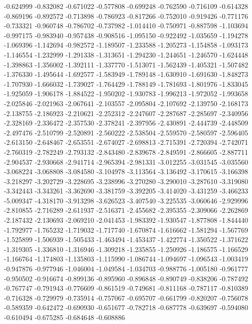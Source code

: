 -0.624999
-0.832082
-0.671022
-0.577808
-0.699248
-0.762590
-0.716109
-0.614328
-0.869196
-0.892572
-0.713898
-0.786923
-0.817266
-0.752010
-0.919426
-0.771176
-0.733321
-0.960748
-0.786702
-0.737982
-1.014410
-0.750971
-0.887598
-1.103694
-0.997175
-0.983940
-0.957438
-0.908516
-1.095150
-0.922492
-1.035659
-1.194278
-1.069396
-1.142694
-0.982572
-1.189507
-1.233588
-1.205273
-1.154858
-1.093173
-1.146554
-1.232999
-1.291338
-1.313651
-1.294230
-1.244651
-1.246570
-1.624448
-1.398863
-1.356002
-1.392111
-1.337770
-1.513071
-1.562439
-1.405321
-1.507482
-1.376330
-1.495644
-1.692577
-1.583949
-1.789148
-1.630910
-1.691630
-1.848273
-1.707930
-1.666032
-1.739027
-1.764429
-1.788149
-1.781693
-1.801976
-1.833045
-1.925059
-1.906178
-1.884522
-1.950202
-1.930783
-1.996213
-1.972052
-1.993658
-2.025846
-2.021963
-2.067641
-2.103557
-2.095804
-2.107692
-2.139750
-2.168173
-2.138755
-2.186923
-2.210621
-2.252312
-2.247607
-2.287687
-2.285697
-2.340956
-2.328169
-2.336472
-2.357530
-2.378241
-2.397956
-2.430891
-2.444739
-2.448509
-2.497476
-2.510799
-2.520891
-2.560222
-2.538504
-2.559570
-2.580597
-2.596405
-2.613150
-2.648467
-2.653551
-2.674027
-2.698813
-2.715391
-2.720394
-2.742071
-2.760319
-2.782249
-2.793132
-2.843480
-2.839678
-2.849591
-2.866605
-2.887711
-2.904537
-2.930668
-2.941714
-2.965394
-2.981331
-3.012255
-3.031545
-3.035560
-3.068224
-3.068808
-3.084580
-3.104978
-3.113564
-3.136492
-3.170615
-3.166398
-3.218297
-3.202729
-3.228695
-3.238996
-3.270280
-3.290010
-3.287610
-3.319080
-3.342443
-3.343261
-3.362690
-3.381759
-3.392205
-3.414020
-3.431259
-3.466233
-5.009347
-4.318170
-3.913298
-3.626523
-3.407540
-3.225535
-3.060646
-2.929996
-2.810855
-2.716289
-2.611937
-2.516371
-2.455682
-2.395355
-2.309066
-2.262869
-2.187432
-2.130693
-2.069210
-2.041453
-1.983392
-1.930547
-1.877808
-1.844440
-1.792977
-1.765232
-1.719032
-1.717740
-1.670874
-1.616662
-1.581294
-1.567769
-1.525899
-1.506939
-1.505433
-1.463494
-1.453437
-1.422774
-1.350522
-1.371622
-1.319305
-1.336810
-1.316946
-1.309218
-1.235855
-1.250926
-1.186575
-1.166529
-1.166764
-1.174803
-1.135803
-1.115990
-1.086744
-1.094697
-1.096543
-1.003419
-0.947876
-0.977946
-1.046004
-1.049584
-1.034703
-0.988776
-1.005180
-0.961777
-0.950502
-0.916674
-0.899136
-0.895960
-0.896848
-0.890749
-0.838206
-0.787492
-0.767747
-0.791943
-0.776609
-0.861519
-0.749681
-0.811168
-0.787117
-0.810389
-0.716328
-0.729979
-0.735914
-0.757067
-0.695707
-0.661799
-0.820207
-0.756078
-0.589359
-0.642472
-0.690930
-0.651677
-0.782718
-0.687778
-0.639697
-0.594080
-0.610494
-0.675285
-0.684648
-0.608886
